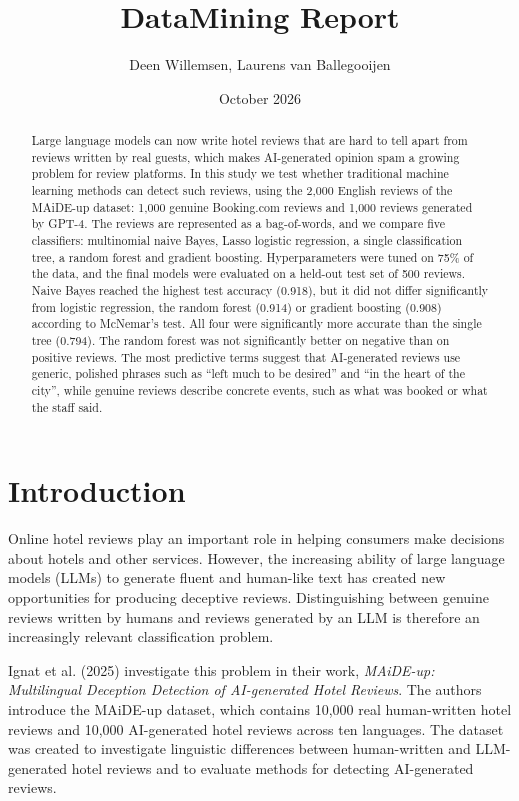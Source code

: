 \documentclass{article}
\title{DataMining Report}
\author{Deen Willemsen, Laurens van Ballegooijen }
\date{October 2026}
\begin{document}
\maketitle

\begin{abstract}
Large language models can now write hotel reviews that are hard to tell apart
from reviews written by real guests, which makes AI-generated opinion spam a
growing problem for review platforms. In this study we test whether
traditional machine learning methods can detect such reviews, using the 2{,}000
English reviews of the MAiDE-up dataset: 1{,}000 genuine Booking.com reviews and
1{,}000 reviews generated by GPT-4. The reviews are represented as a
bag-of-words, and we compare five classifiers: multinomial naive Bayes, Lasso
logistic regression, a single classification tree, a random forest and gradient
boosting. Hyperparameters were tuned on 75\% of the data, and the final models
were evaluated on a held-out test set of 500 reviews. Naive Bayes reached the
highest test accuracy (0.918), but it did not differ significantly from logistic
regression, the random forest (0.914) or gradient boosting (0.908) according to
McNemar's test. All four were significantly more accurate than the single tree
(0.794). The random forest was not significantly better on negative than on
positive reviews. The most predictive terms suggest that AI-generated reviews
use generic, polished phrases such as ``left much to be desired'' and ``in the
heart of the city'', while genuine reviews describe concrete events, such as
what was booked or what the staff said.
\end{abstract}

\section{Introduction}
Online hotel reviews play an important role in helping consumers make decisions about hotels and other services. However, the increasing ability of large language models (LLMs) to generate fluent and human-like text has created new opportunities for producing deceptive reviews. Distinguishing between genuine reviews written by humans and reviews generated by an LLM is therefore an increasingly relevant classification problem.

Ignat et al. (2025) investigate this problem in their work, \textit{MAiDE-up: Multilingual Deception Detection of AI-generated Hotel Reviews}. The authors introduce the MAiDE-up dataset, which contains 10,000 real human-written hotel reviews and 10,000 AI-generated hotel reviews across ten languages. The dataset was created to investigate linguistic differences between human-written and LLM-generated hotel reviews and to evaluate methods for detecting AI-generated reviews. \cite{ignat-etal-2025-maide}
\end{document}

